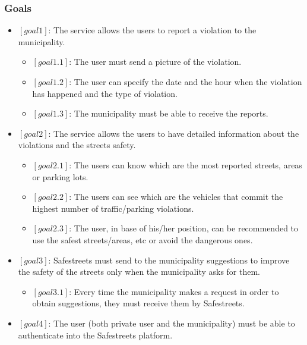 \documentclass[titlepage]{article}
\begin{document}
\subsubsection{Goals}
\begin{itemize}
\item $[goal 1]$:  The service allows the users to report a violation to the municipality.
\begin{itemize}

	\item $[goal 1.1]$: The user must send a picture of the 			violation.
	
	\item $[goal 1.2]$: The user can specify the date and the 						hour when the violation has happened 							and the type of violation.
	

	\item $[goal 1.3]$: The municipality must be able to     	receive the reports.  \\
	
\end{itemize}

\item $[goal 2]$: The service allows the users to have detailed information about the violations and the streets safety.
      \begin{itemize}
      	\item $[goal 2.1]$: The users can know which are the 			most reported streets, areas or parking lots.
      	
      	\item $[goal 2.2]$: The users can see which are the 				vehicles that commit the highest number
		of traffic/parking violations.
		
		\item $[goal 2.3]$: The user, in base of his/her 				position, can be recommended to use the safest 					streets/areas, etc or avoid the dangerous ones.\\

      \end{itemize}

\item $[goal 3]$: Safestreets must send to the municipality suggestions to improve the safety of the streets only when the municipality asks for them.
	\begin{itemize}
	\item $[goal 3.1]$: Every time the municipality makes a request in order to obtain suggestions, they must receive them by Safestreets.
					   
	
	\end{itemize}
\item $[goal 4]$: The user (both private user and the municipality) must be able to authenticate into the Safestreets platform.


\end{itemize}
\end{document}
